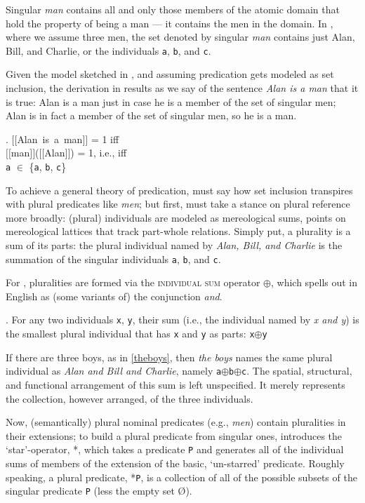 \documentclass[linguex]{sp}
\newcommand{\sem}[1]{\mbox{$[\![$#1$]\!]$}}
\renewcommand{\tt}{\texttt}
\begin{document}
Singular \emph{man} contains all and only those members of the atomic domain that hold the property of being a man --- it contains the men in the domain. In \Last, where we assume three men, the set denoted by singular \emph{man} contains just Alan, Bill, and Charlie, or the individuals \tt{a}, \tt{b}, and \tt{c}.

Given the model sketched in \Last, and assuming predication gets modeled as set inclusion, the derivation in \Next results as we say of the sentence \emph{Alan is a man} that it is true: Alan is a man just in case he is a member of the set of singular men; Alan is in fact a member of the set of singular men, so he is a man.

\ex. \sem{Alan is a man} = 1 iff\\
\sem{man}(\sem{Alan}) = 1, i.e., iff\\
\texttt{a} $\in$ \{\texttt{a}, \texttt{b}, \texttt{c}\}

To achieve a general theory of predication, \citeauthor{link1983} must say how set inclusion transpires with plural predicates like \emph{men}; but first, \citeauthor{link1983} must take a stance on plural reference more broadly: (plural) individuals are modeled as mereological sums, points on mereological lattices that track part-whole relations. Simply put, a plurality is a sum of its parts: the plural individual named by \emph{Alan, Bill, and Charlie} is the summation of the singular individuals \tt{a}, \tt{b}, and \tt{c}. 

For \citeauthor{link1983}, pluralities are formed via the \textsc{individual sum} operator $\oplus$, which spells out in English as (some variants of) the conjunction \emph{and}.

\ex. For any two individuals \texttt{x}, \texttt{y}, their sum (i.e., the individual named by \emph{x and y}) is the smallest plural individual that has \texttt{x} and \texttt{y} as parts: \texttt{x}$\oplus$\texttt{y}

If there are three boys, as in \ref{theboys}, then \emph{the boys} names the same plural individual as \emph{Alan and Bill and Charlie}, namely \texttt{a}$\oplus$\texttt{b}$\oplus$\texttt{c}. The spatial, structural, and functional arrangement of this sum is left unspecified. It merely represents the collection, however arranged, of the three individuals.

Now, (semantically) plural nominal predicates (e.g., \emph{men}) contain pluralities in their extensions; to build a plural predicate from singular ones, \citeauthor{link1983} introduces the `star'-operator, *, which takes a predicate \texttt{P} and generates all of the individual sums of members of the extension of the basic, `un-starred' predicate. Roughly speaking, a plural predicate, *\texttt{P}, is a collection of all of the possible subsets of the singular predicate \texttt{P} (less the empty set \O).
\end{document}
